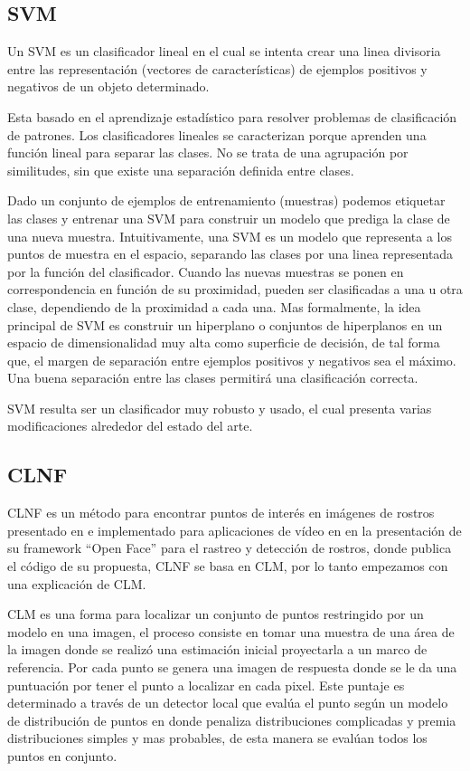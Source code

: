 \subsection{\acf{SVM}}
Un \ac{SVM} \citep{cortes1995support} es un clasificador lineal en el cual se intenta crear una linea divisoria entre las representación (vectores de características) de ejemplos positivos y negativos de un objeto determinado.

Esta basado en el aprendizaje estadístico para resolver problemas de clasificación de patrones. Los clasificadores lineales se caracterizan porque aprenden una función lineal para separar las clases. No se trata de una agrupación por similitudes, sin que existe una separación definida entre clases.

Dado un conjunto de ejemplos de entrenamiento (muestras) podemos etiquetar las clases y entrenar una SVM para construir un modelo que prediga la clase de una nueva muestra. Intuitivamente, una SVM es un modelo que representa a los puntos de muestra en el espacio, separando las clases por una linea representada por la función del clasificador. Cuando las nuevas muestras se ponen en correspondencia en función de su proximidad, pueden ser clasificadas a una u otra clase, dependiendo de la proximidad a cada una. Mas formalmente, la idea principal de SVM es construir un hiperplano o conjuntos de hiperplanos en un espacio de dimensionalidad muy alta como superficie de decisión, de tal forma que, el margen de separación entre ejemplos positivos y negativos sea el máximo. Una buena separación entre las clases permitirá una clasificación correcta. 

\ac{SVM} resulta ser un clasificador muy robusto y usado, el cual presenta varias modificaciones alrededor del estado del arte.


\subsection{\acf{CLNF}}
\ac{CLNF} es un método para encontrar puntos de interés en imágenes de rostros presentado en \cite{baltrusaitis2013constrained} e implementado para aplicaciones de vídeo en \cite{Baltrusaitis2016} en la presentación de su framework ``Open Face'' para el rastreo y detección de rostros, donde publica el código de su propuesta, \ac{CLNF} se basa en \ac{CLM}, por lo tanto empezamos con una explicación de \ac{CLM}.

\ac{CLM} es una forma para localizar un conjunto de puntos restringido por un modelo en una imagen, el proceso consiste en tomar una muestra de una área de la imagen donde se realizó una estimación inicial proyectarla a un marco de referencia. Por cada punto se genera una imagen de respuesta donde se le da una puntuación por tener el punto a localizar en cada pixel. Este puntaje es determinado a través de un detector local que evalúa el punto según un modelo de distribución de puntos en donde penaliza distribuciones complicadas y premia distribuciones simples y mas probables, de esta manera se evalúan todos los puntos en conjunto.


